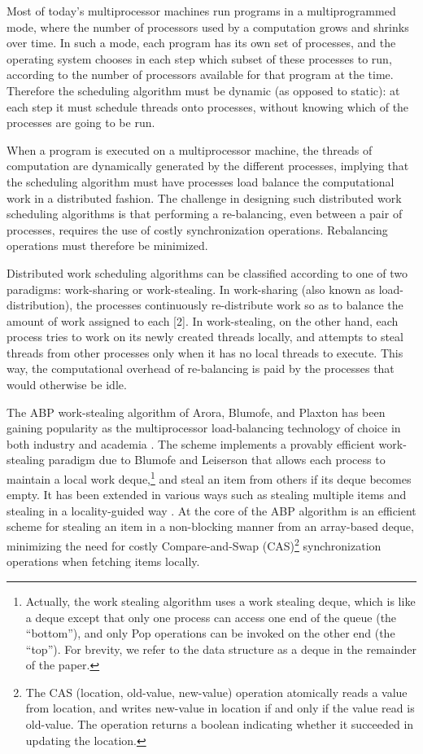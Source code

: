 Most of today's multiprocessor machines run programs in a
multiprogrammed mode, where the number of processors used by a
computation grows and shrinks over time. In such a mode, each program
has its own set of processes, and the operating system chooses in each
step which subset of these processes to run, according to the number
of processors available for that program at the time. Therefore the
scheduling algorithm must be dynamic (as opposed to static): at each
step it must schedule threads onto processes, without knowing which of
the processes are going to be run.

When a program is executed on a multiprocessor machine, the threads
of computation are dynamically generated by the different processes,
implying that the scheduling algorithm must have processes load
balance the computational work in a distributed fashion. The
challenge in designing such distributed work scheduling algorithms
is that performing a re-balancing, even between a pair of processes,
requires the use of costly synchronization operations. Rebalancing
operations must therefore be minimized.

Distributed work scheduling algorithms can be classified according to
one of two paradigms: work-sharing or work-stealing. In work-sharing
(also known as load-distribution), the processes continuously
re-distribute work so as to balance the amount of work assigned to
each [2]. In work-stealing, on the other hand, each process tries to
work on its newly created threads locally, and attempts to steal
threads from other processes only when it has no local threads to
execute. This way, the computational overhead of re-balancing is paid
by the processes that would otherwise be idle.

The ABP work-stealing algorithm of Arora, Blumofe, and Plaxton
\cite{Arora2001} has been gaining popularity as the multiprocessor
load-balancing technology of choice in both industry and academia
\cite{Arora2001, Acar2002, Blumofe1995, Frigo1998, Danaher2005}. The
scheme implements a provably efficient work-stealing paradigm due to
Blumofe and Leiserson \cite{Blumofe1999} that allows each process to
maintain a local work deque,\footnote{Actually, the work stealing
  algorithm uses a work stealing deque, which is like a deque
  \cite{Knuth1997} except that only one process can access one end of
  the queue (the ``bottom''), and only Pop operations can be invoked
  on the other end (the ``top''). For brevity, we refer to the data
  structure as a deque in the remainder of the paper.} and steal an
item from others if its deque becomes empty. It has been extended in
various ways such as stealing multiple items \cite{Hendler2002} and
stealing in a locality-guided way \cite{Acar2002}. At the core of the
ABP algorithm is an efficient scheme for stealing an item in a
non-blocking manner from an array-based deque, minimizing the need for
costly Compare-and-Swap (CAS)\footnote{The CAS (location, old-value,
  new-value) operation atomically reads a value from location, and
  writes new-value in location if and only if the value read is
  old-value. The operation returns a boolean indicating whether it
  succeeded in updating the location.} synchronization operations when
fetching items locally.

